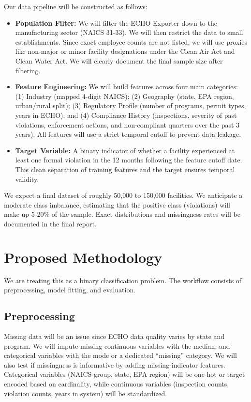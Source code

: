\documentclass{article}
\begin{document}
Our data pipeline will be constructed as follows:

\begin{itemize}
    \item \textbf{Population Filter:} We will filter the ECHO Exporter down to the manufacturing sector (NAICS 31-33). We will then restrict the data to small establishments. Since exact employee counts are not listed, we will use proxies like non-major or minor facility designations under the Clean Air Act and Clean Water Act. We will clearly document the final sample size after filtering.
    
    \item \textbf{Feature Engineering:} We will build features across four main categories: (1) Industry (mapped 4-digit NAICS); (2) Geography (state, EPA region, urban/rural split); (3) Regulatory Profile (number of programs, permit types, years in ECHO); and (4) Compliance History (inspections, severity of past violations, enforcement actions, and non-compliant quarters over the past 3 years). All features will use a strict temporal cutoff to prevent data leakage.
    
    \item \textbf{Target Variable:} A binary indicator of whether a facility experienced at least one formal violation in the 12 months following the feature cutoff date. This clean separation of training features and the target ensures temporal validity.
\end{itemize}

We expect a final dataset of roughly 50,000 to 150,000 facilities. We anticipate a moderate class imbalance, estimating that the positive class (violations) will make up 5-20\% of the sample. Exact distributions and missingness rates will be documented in the final report.

\section{Proposed Methodology}

We are treating this as a binary classification problem. The workflow consists of preprocessing, model fitting, and evaluation.

\subsection{Preprocessing}
Missing data will be an issue since ECHO data quality varies by state and program. We will impute missing continuous variables with the median, and categorical variables with the mode or a dedicated ``missing'' category. We will also test if missingness is informative by adding missing-indicator features. Categorical variables  (NAICS group, state, EPA region) will be one-hot or target encoded based on cardinality, while continuous variables  (inspection counts, violation
counts, years in system) will be standardized.
\end{document}

